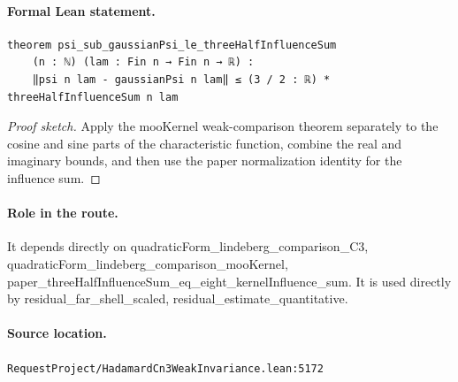 \medskip
\paragraph{Formal Lean statement.}
\begin{verbatim}
theorem psi_sub_gaussianPsi_le_threeHalfInfluenceSum
    (n : ℕ) (lam : Fin n → Fin n → ℝ) :
    ‖psi n lam - gaussianPsi n lam‖ ≤ (3 / 2 : ℝ) * threeHalfInfluenceSum n lam
\end{verbatim}
\begin{proof}[Proof sketch]
Apply the mooKernel weak-comparison theorem separately to the cosine and sine parts of the characteristic function, combine the real and imaginary bounds, and then use the paper normalization identity for the influence sum.
\end{proof}
\paragraph{Role in the route.}
It depends directly on quadraticForm\_lindeberg\_comparison\_C3, quadraticForm\_lindeberg\_comparison\_mooKernel, paper\_threeHalfInfluenceSum\_eq\_eight\_kernelInfluence\_sum. It is used directly by residual\_far\_shell\_scaled, residual\_estimate\_quantitative.
\paragraph{Source location.}
\texttt{RequestProject/HadamardCn3WeakInvariance.lean:5172}
\medskip
